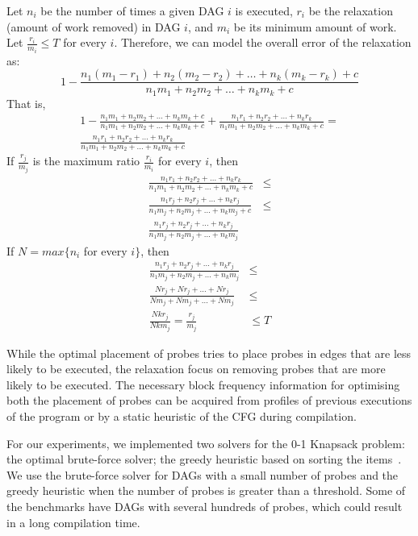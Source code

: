 Let $n_i$ be the number of times a given DAG $i$ is executed, $r_i$ be the relaxation (amount of work removed) in DAG $i$, and $m_i$ be its minimum amount of work.
Let $\frac{r_i}{m_i} \leq T$ for every $i$.
Therefore, we can model the overall error of the relaxation as:
\[
1 - \frac{n_1(m_1 - r_1) + n_2(m_2 - r_2) + \ldots + n_k(m_k - r_k) + c}{n_1m_1 + n_2m_2 + \ldots + n_km_k + c}
\]
That is,
\begin{gather*}
 1 - \frac{n_1m_1 + n_2m_2 + \ldots + n_km_k + c}{n_1m_1 + n_2m_2 + \ldots + n_km_k + c} + \frac{n_1r_1 + n_2r_2 + \ldots + n_kr_k}{n_1m_1 + n_2m_2 + \ldots + n_km_k + c} = \\
 \frac{n_1r_1 + n_2r_2 + \ldots + n_kr_k}{n_1m_1 + n_2m_2 + \ldots + n_km_k + c}
\end{gather*}
If $\frac{r_j}{m_j}$ is the maximum ratio $\frac{r_i}{m_i}$ for every $i$, then
\begin{equation*}
\begin{aligned}
 \frac{n_1r_1 + n_2r_2 + \ldots + n_kr_k}{n_1m_1 + n_2m_2 + \ldots + n_km_k + c} &\leq\\
 \frac{n_1r_j + n_2r_j + \ldots + n_kr_j}{n_1m_j + n_2m_j + \ldots + n_km_j + c} &\leq\\
 \frac{n_1r_j + n_2r_j + \ldots + n_kr_j}{n_1m_j + n_2m_j + \ldots + n_km_j} & 
\end{aligned}
\end{equation*}
If $N = max\{n_i$ for every $i\}$, then
\begin{equation*}
\begin{aligned}
 \frac{n_1r_j + n_2r_j + \ldots + n_kr_j}{n_1m_j + n_2m_j + \ldots + n_km_j} &\leq\\
 \frac{Nr_j + Nr_j + \ldots + Nr_j}{Nm_j + Nm_j + \ldots + Nm_j} &\leq\\
 \frac{Nkr_j}{Nkm_j} = \frac{r_j}{m_j} &\leq T
\end{aligned}
\end{equation*}

While the optimal placement of probes tries to place probes in edges that are less likely to be executed, the relaxation focus on removing probes that are more likely to be executed.
The necessary block frequency information for optimising both the placement of probes can be acquired from profiles of previous executions of the program or by a static heuristic of the CFG during compilation.

For our experiments, we implemented two solvers for the 0-1 Knapsack problem:
the optimal brute-force solver;
the greedy heuristic based on sorting the items~\citep{dantzig57}.
We use the brute-force solver for DAGs with a small number of probes and the greedy heuristic when the number of probes is greater than a threshold.
Some of the benchmarks have DAGs with several hundreds of probes, which could result in a long compilation time.

